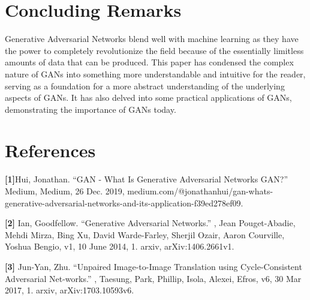 \documentclass{cup-pan}
\begin{document}
\section{Concluding Remarks}

Generative Adversarial Networks blend well with machine learning as they have the power to completely revolutionize the field because of the essentially limitless amounts of data that can be produced. This paper has condensed the complex nature of GANs into something more understandable and intuitive for the reader, serving as a foundation for a more abstract understanding of the underlying aspects of GANs. It has also delved into some practical applications of GANs, demonstrating the importance of GANs today.

\section{References}
\noindent \textbf{[1]}Hui, Jonathan. “GAN - What Is Generative Adversarial Networks GAN?” Medium, Medium, 26 \indent Dec. 2019, medium.com/@jonathanhui/gan-whats-generative-adversarial-networks-and-its-\indent application-f39ed278ef09.

\noindent \textbf{[2]} Ian, Goodfellow. “Generative Adversarial Networks.” , Jean Pouget-Abadie, Mehdi Mirza, Bing \indent Xu, David Warde-Farley, Sherjil Ozair, Aaron Courville, Yoshua Bengio, v1, 10 June 2014, 1. arxiv,  \indent arXiv:1406.2661v1. 

\noindent \textbf{[3]} Jun-Yan, Zhu. “Unpaired Image-to-Image Translation using Cycle-Consistent Adversarial Net-\indent works.” , Taesung, Park, Phillip, Isola, Alexei, Efros, v6, 30 Mar 2017, 1. arxiv, arXiv:1703.10593v6. 
\end{document}
